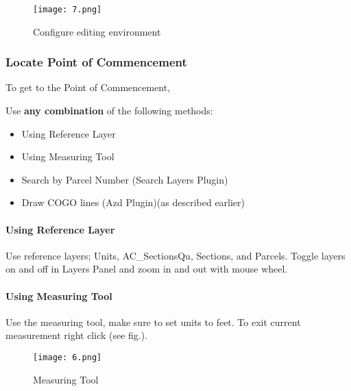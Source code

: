 \begin{figure}[H]
\begin{center}
\texttt{[image: 7.png]}
\end{center}
\caption{Configure editing environment}
\end{figure}

\clearpage

\subsubsection[Locate Point of Commencement]{\Large Locate Point of Commencement}
To get to the Point of Commencement,
\medskip

Use \textbf{any combination} of the following methods:
\begin{itemize}
\item{Using Reference Layer}
\item{Using Measuring Tool}
\item{Search by Parcel Number \small(Search Layers Plugin)}
\item{Draw COGO lines \small(Azd Plugin)}\small(as described earlier)
\end{itemize}

\paragraph{Using Reference Layer}
\large Use reference layers; Units, AC\_SectionsQu, Sections, and Parcels.  Toggle layers on and off in Layers Panel and zoom in and out with mouse wheel.
\clearpage

\paragraph{Using Measuring Tool}
\large Use the measuring tool, make sure to set units to feet.  To exit current measurement right click (see fig.).
\begin{figure}[H]
\begin{center}
\texttt{[image: 6.png]}
\end{center}
\caption{Measuring Tool}
\end{figure}
\clearpage

